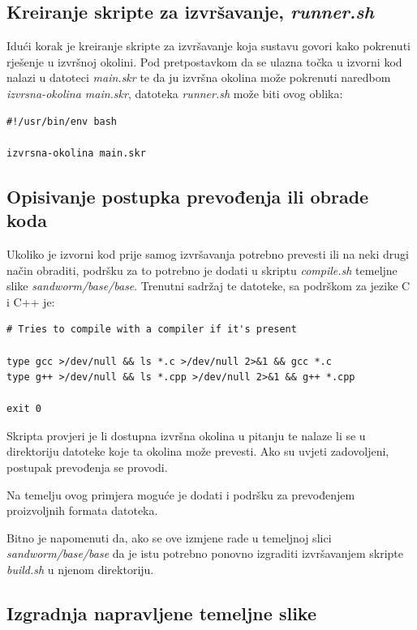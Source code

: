 \documentclass[times, utf8, zavrsni]{fer}
\begin{document}
{{\begin{appendices}
\subsection{Kreiranje skripte za izvršavanje, {\textit{runner.sh}}}

Idući korak je kreiranje skripte za izvršavanje koja sustavu govori kako pokrenuti rješenje u izvršnoj okolini. Pod pretpostavkom da se ulazna točka u izvorni kod nalazi u datoteci {\textit{main.skr}} te da ju izvršna okolina može pokrenuti naredbom {\textit{izvrsna-okolina main.skr}}, datoteka {\textit{runner.sh}} može biti ovog oblika:

\begin{lstlisting}
#!/usr/bin/env bash

izvrsna-okolina main.skr
\end{lstlisting}

\subsection{Opisivanje postupka prevođenja ili obrade koda}

Ukoliko je izvorni kod prije samog izvršavanja potrebno prevesti ili na neki drugi način obraditi, podršku za to potrebno je dodati u skriptu {\textit{compile.sh}} temeljne slike {\textit{sandworm/base/base}}. Trenutni sadržaj te datoteke, sa podrškom za jezike C i C++ je:

\begin{lstlisting}
# Tries to compile with a compiler if it's present

type gcc >/dev/null && ls *.c >/dev/null 2>&1 && gcc *.c
type g++ >/dev/null && ls *.cpp >/dev/null 2>&1 && g++ *.cpp

exit 0
\end{lstlisting}

Skripta provjeri je li dostupna izvršna okolina u pitanju te nalaze li se u direktoriju datoteke koje ta okolina može prevesti. Ako su uvjeti zadovoljeni, postupak prevođenja se provodi.

Na temelju ovog primjera moguće je dodati i podršku za prevođenjem proizvoljnih formata datoteka.

Bitno je napomenuti da, ako se ove izmjene rade u temeljnoj slici {\textit{sandworm/base/base}} da je istu potrebno ponovno izgraditi izvršavanjem skripte {\textit{build.sh}} u njenom direktoriju.

\subsection{Izgradnja napravljene temeljne slike}


\end{appendices}}}
\end{document}
